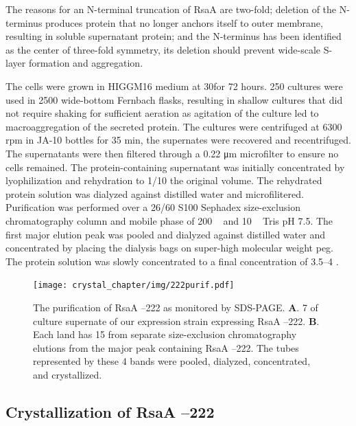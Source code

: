 The reasons for an N-terminal truncation of RsaA are two-fold; deletion
of the N-terminus produces protein that no longer anchors itself to
outer membrane, resulting in soluble supernatant protein; and the
N-terminus has been identified as the center of three-fold symmetry, its
deletion should prevent wide-scale \ac{S-layer} formation and aggregation.

The cells were grown in HIGGM16 medium
at 30\cel for 72 hours. 250 \millilitre cultures
were used in 2500 \millilitre wide-bottom Fernbach flasks, resulting in shallow
cultures that did not require shaking for sufficient aeration as
agitation of the culture led to macroaggregation of the secreted
protein. The cultures were centrifuged at 6300 rpm in JA-10 bottles for
35 min, the supernates were recovered and recentrifuged. The
supernatants were then filtered through a 0.22 \si{\micro\meter} microfilter to ensure
no cells remained. The protein-containing supernatant was initially
concentrated by lyophilization and rehydration to 1/10 the original
volume. The rehydrated protein solution was dialyzed against distilled
water and microfilitered. Purification was performed over a 26/60 S100
Sephadex size-exclusion chromatography column and mobile phase of 200 \si{\milli\molar}  and 10 \si{\milli\molar}
Tris pH 7.5. The first major elution peak was pooled and dialyzed
against distilled water and concentrated by placing the dialysis bags on
super-high molecular weight \ac{peg}. The protein
solution was slowly concentrated to a final concentration of 3.5--4
\mgperml.

\begin{figure}[htb]
  	\begin{center}
   		\texttt{[image: crystal\_chapter/img/222purif.pdf]}
   	\end{center}
   	\caption[Purification of RsaA --222 shown by \ac{SDS-PAGE}]{
      The purification of RsaA --222 as monitored by \ac{SDS-PAGE}.
      \textbf{A}. 7 \microlitre{} of culture supernate of our \caulobacter{}
      expression strain expressing RsaA --222. \textbf{B}. Each land has
      15 \microlitre{} from separate  size-exclusion chromatography elutions
      from the major peak containing RsaA --222. The tubes represented by
      these 4 bands were pooled, dialyzed, concentrated, and crystallized.
}
   	\label{fig:222purif}
\end{figure}   

\subsection{Crystallization of RsaA --222}\label{crystallization}

